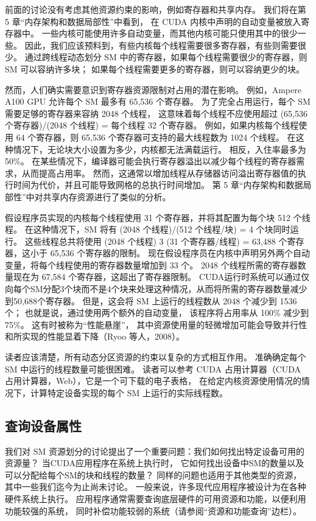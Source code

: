 前面的讨论没有考虑其他资源约束的影响，例如寄存器和共享内存。 我们将在第 5 章“内存架构和数据局部性”中看到，
在 CUDA 内核中声明的自动变量被放入寄存器中。 一些内核可能使用许多自动变量，而其他内核可能只使用其中的很少一些。 
因此，我们应该预料到，有些内核每个线程需要很多寄存器，有些则需要很少。 
通过跨线程动态划分 SM 中的寄存器，如果每个线程需要很少的寄存器，则 SM 可以容纳许多块；
如果每个线程需要更多的寄存器，则可以容纳更少的块。

然而，人们确实需要意识到寄存器资源限制对占用的潜在影响。 例如，Ampere A100 GPU 允许每个 SM 最多有 65,536 个寄存器。 
为了完全占用运行，每个 SM 需要足够的寄存器来容纳 2048 个线程，
这意味着每个线程不应使用超过 (65,536 个寄存器)/(2048 个线程) = 每个线程 32 个寄存器。 
例如，如果内核每个线程使用 64 个寄存器，则 65,536 个寄存器可支持的最大线程数为 1024 个线程。 
在这种情况下，无论块大小设置为多少，内核都无法满载运行。 相反，入住率最多为50\%。 
在某些情况下，编译器可能会执行寄存器溢出以减少每个线程的寄存器需求，从而提高占用率。 
然而，这通常以增加线程从存储器访问溢出寄存器值的执行时间为代价，并且可能导致网格的总执行时间增加。 
第 5 章“内存架构和数据局部性”中对共享内存资源进行了类似的分析。

假设程序员实现的内核每个线程使用 31 个寄存器，并将其配置为每个块 512 个线程。 
在这种情况下，SM 将有 (2048 个线程)/(512 个线程/块) = 4 个块同时运行。 
这些线程总共将使用 (2048 个线程) 3 (31 个寄存器/线程) = 63,488 个寄存器，这小于 65,536 个寄存器的限制。 
现在假设程序员在内核中声明另外两个自动变量，将每个线程使用的寄存器数量增加到 33 个。
2048 个线程所需的寄存器数量现在为 67,584 个寄存器，这超出了寄存器限制。
 CUDA运行时系统可以通过仅向每个SM分配3个块而不是4个块来处理这种情况，从而将所需的寄存器数量减少到50,688个寄存器。 
 但是，这会将 SM 上运行的线程数从 2048 个减少到 1536 个； 也就是说，通过使用两个额外的自动变量，
 该程序将占用率从 100\% 减少到 75\%。 这有时被称为“性能悬崖”，
 其中资源使用量的轻微增加可能会导致并行性和所实现的性能显着下降（Ryoo 等人，2008）。

读者应该清楚，所有动态分区资源的约束以复杂的方式相互作用。 准确确定每个 SM 中运行的线程数量可能很困难。 
读者可以参考 CUDA 占用计算器（CUDA 占用计算器，Web），它是一个可下载的电子表格，
在给定内核资源使用情况的情况下，计算特定设备实现的每个 SM 上运行的实际线程数。

\subsection{查询设备属性}
我们对 SM 资源划分的讨论提出了一个重要问题：我们如何找出特定设备可用的资源量？ 当CUDA应用程序在系统上执行时，
它如何找出设备中SM的数量以及可以分配给每个SM的块和线程的数量？ 同样的问题也适用于其他类型的资源，
其中一些我们迄今为止尚未讨论。 一般来说，许多现代应用程序被设计为在各种硬件系统上执行。 
应用程序通常需要查询底层硬件的可用资源和功能，以便利用功能较强的系统，
同时补偿功能较弱的系统（请参阅“资源和功能查询”边栏）。

